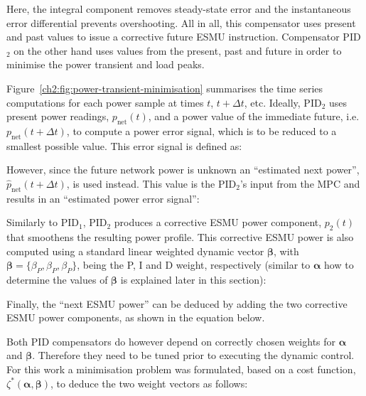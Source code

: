 Here, the integral component removes steady-state error and the instantaneous error differential prevents overshooting.
All in all, this compensator uses present and past values to issue a corrective future ESMU instruction.
Compensator PID$_2$ on the other hand uses values from the present, past and future in order to minimise the power transient and load peaks.



Figure~\ref{ch2:fig:power-transient-minimisation} summarises the time series computations for each power sample at times $t$, $t+\Delta t$, etc.
Ideally, PID$_2$ uses present power readings, $p_\text{net}(t)$, and a power value of the immediate future, i.e. $p_\text{net}(t+\Delta t)$, to compute a power error signal, which is to be reduced to a smallest possible value.
This error signal is defined as:



However, since the future network power is unknown an ``estimated next power'', $\hat{p}_\text{net}(t+\Delta t)$, is used instead.
This value is the PID$_2$'s input from the MPC and results in an ``estimated power error signal'':



Similarly to PID$_1$, PID$_2$ produces a corrective ESMU power component, $p_2(t)$ that smoothens the resulting power profile.
This corrective ESMU power is also computed using a standard linear weighted dynamic vector $\boldsymbol{\beta}$, with $\boldsymbol{\beta} = \{\beta_P, \beta_P, \beta_P\}$, being the P, I and D weight, respectively (similar to $\boldsymbol{\alpha}$ how to determine the values of $\boldsymbol{\beta}$ is explained later in this section):



Finally, the ``next ESMU power'' can be deduced by adding the two corrective ESMU power components, as shown in the equation below.



Both PID compensators do however depend on correctly chosen weights for $\boldsymbol{\alpha}$ and $\boldsymbol{\beta}$.
Therefore they need to be tuned prior to executing the dynamic control.
For this work a minimisation problem was formulated, based on a cost function, $\zeta^*(\boldsymbol{\alpha}, \boldsymbol{\beta})$, to deduce the two weight vectors as follows:


